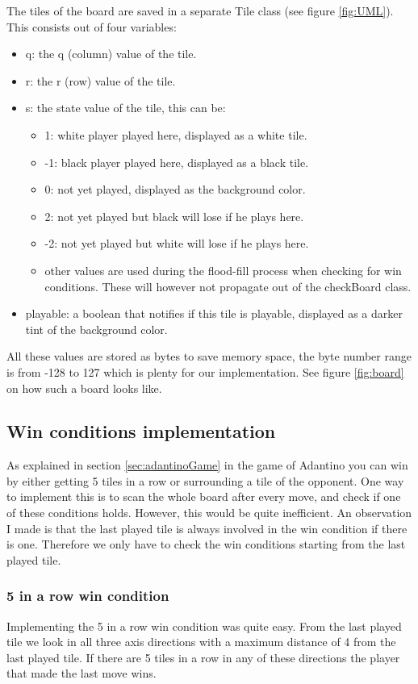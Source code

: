 \documentclass{article}
\begin{document}
The tiles of the board are saved in a separate Tile class (see figure \ref{fig:UML}). This consists out of four variables:
\begin{itemize}
    \item q: the q (column) value of the tile.
    \item r: the r (row) value of the tile.
    \item s: the state value of the tile, this can be:
    \begin{itemize}
        \item 1: white player played here, displayed as a white tile.
        \item -1: black player played here, displayed as a black tile.
        \item 0: not yet played, displayed as the background color.
        \item 2: not yet played but black will lose if he plays here.
        \item -2: not yet played but white will lose if he plays here.
        \item other values are used during the flood-fill process when checking for win conditions. These will however not propagate out of the checkBoard class.
    \end{itemize}
    \item playable: a boolean that notifies if this tile is playable, displayed as a darker tint of the background color.
\end{itemize}

All these values are stored as bytes to save memory space, the byte number range is from -128 to 127 which is plenty for our implementation. See figure \ref{fig:board} on how such a board looks like.

\subsection{Win conditions implementation}
As explained in section \ref{sec:adantinoGame} in the game of Adantino you can win by either getting 5 tiles in a row or surrounding a tile of the opponent. One way to implement this is to scan the whole board after every move, and check if one of these conditions holds. However, this would be quite inefficient. An observation I made is that the last played tile is always involved in the win condition if there is one. Therefore we only have to check the win conditions starting from the last played tile.  

\subsubsection{5 in a row win condition}
Implementing the 5 in a row win condition was quite easy. From the last played tile we look in all three axis directions with a maximum distance of 4 from the last played tile. If there are 5 tiles in a row in any of these directions the player that made the last move wins.
\end{document}
